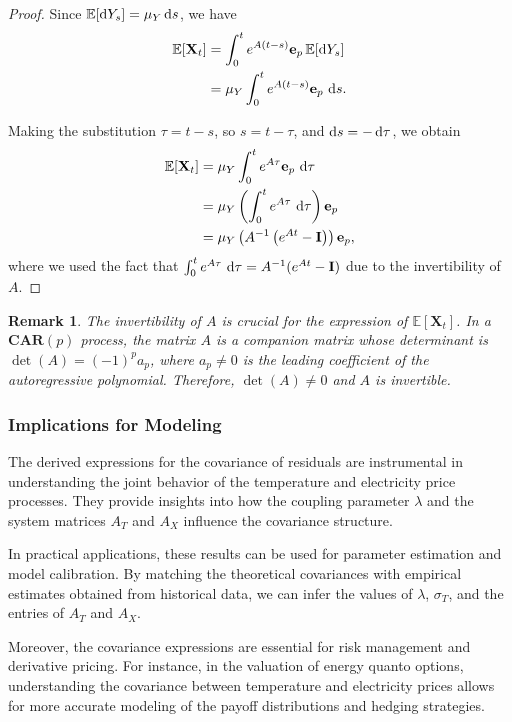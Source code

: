 \documentclass[10pt,a4paper,reqno]{amsart}
\newtheorem{remark}[theorem]{Remark}
\theoremstyle{example}
\newcommand*\D{\mathop{}\!\textnormal{d}}
\begin{document}
\begin{proof}
Since $\mathbb{E}[ \D Y_s ] = \mu_Y \D s$, we have
\begin{align*}
\mathbb{E}[\mathbf{X}_t] &= \int_0^t e^{A (t - s)} \mathbf{e}_p \, \mathbb{E}[ \D Y_s ] \\
&= \mu_Y \int_0^t e^{A (t - s)} \mathbf{e}_p \, \D s.
\end{align*}

Making the substitution $\tau = t - s$, so $s = t - \tau$, and $\D s = - \D \tau$, we obtain
\begin{align*}
\mathbb{E}[\mathbf{X}_t] &= \mu_Y \int_0^t e^{A \tau} \mathbf{e}_p \, \D \tau \\
&= \mu_Y \left( \int_0^t e^{A \tau} \, \D \tau \right) \mathbf{e}_p \\
&= \mu_Y \left( A^{-1} \left( e^{A t} - \mathbf{I} \right) \right) \mathbf{e}_p,
\end{align*}
where we used the fact that $\int_0^t e^{A \tau} \, \D \tau = A^{-1} ( e^{A t} - \mathbf{I} )$ due to the invertibility of $A$.
\end{proof}

\begin{remark}
The invertibility of $A$ is crucial for the expression of $\mathbb{E}[\mathbf{X}_t]$. In a $\mathbf{CAR}(p)$ process, the matrix $A$ is a companion matrix whose determinant is $\det(A) = (-1)^p a_p$, where $a_p \neq 0$ is the leading coefficient of the autoregressive polynomial. Therefore, $\det(A) \neq 0$ and $A$ is invertible.
\end{remark}

\subsubsection{Implications for Modeling}

The derived expressions for the covariance of residuals are instrumental in
understanding the joint behavior of the temperature and electricity price
processes. They provide insights into how the coupling parameter $\lambda$ and
the system matrices $A_T$ and $A_X$ influence the covariance structure. 

In practical applications, these results can be used for parameter estimation
and model calibration. By matching the theoretical covariances with empirical
estimates obtained from historical data, we can infer the values of $\lambda$,
$\sigma_T$, and the entries of $A_T$ and $A_X$. 

Moreover, the covariance expressions are essential for risk management and
derivative pricing. For instance, in the valuation of energy quanto options,
understanding the covariance between temperature and electricity prices allows
for more accurate modeling of the payoff distributions and hedging strategies. 
\end{document}
